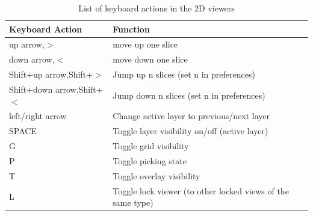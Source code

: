 \documentclass[fleqn,11pt,openany]{book}
\begin{document}
\begin{table}[h!]
\label{tab:2dkey}
\caption{List of keyboard actions in the 2D viewers}
\begin{tabular}{|l|l|}
\hline
{\bf Keyboard Action} & {\bf Function}\\
\hline
up arrow,$>$ & move up one slice\\
down arrow,$<$ & move down one slice\\
\hline
Shift+up arrow,Shift+$>$ & Jump up n slices (set n in preferences)\\
Shift+down arrow,Shift+$<$ & Jump down n slices (set n in preferences)\\
\hline
left/right arrow & Change active layer to previous/next layer\\
\hline
SPACE & Toggle layer visibility on/off (active layer)\\
\hline
G & Toggle grid visibility\\
\hline
P & Toggle picking state\\
\hline
T & Toggle overlay visibility\\
\hline
L & Toggle lock viewer (to other locked views of the same type)\\
\hline
\end{tabular}
\end{table}
\end{document}
